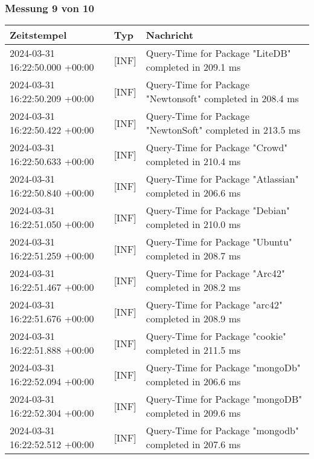     \subsubsection{Messung 9 von 10} \label{subsubsec:MySQLOhneIndex9von10}
        {
            {\small
                \begin{tabularx}{\textwidth}{|l|l|X|}
                    \hline
                    \textbf{Zeitstempel} & \textbf{Typ} & \textbf{Nachricht} \\
                    \hline
                    \endhead
                    2024-03-31 16:22:50.000 +00:00 & [INF] & Query-Time for Package "LiteDB" completed in 209.1 ms \\
                    2024-03-31 16:22:50.209 +00:00 & [INF] & Query-Time for Package "Newtonsoft" completed in 208.4 ms \\
                    2024-03-31 16:22:50.422 +00:00 & [INF] & Query-Time for Package "NewtonSoft" completed in 213.5 ms \\
                    2024-03-31 16:22:50.633 +00:00 & [INF] & Query-Time for Package "Crowd" completed in 210.4 ms \\
                    2024-03-31 16:22:50.840 +00:00 & [INF] & Query-Time for Package "Atlassian" completed in 206.6 ms \\
                    2024-03-31 16:22:51.050 +00:00 & [INF] & Query-Time for Package "Debian" completed in 210.0 ms \\
                    2024-03-31 16:22:51.259 +00:00 & [INF] & Query-Time for Package "Ubuntu" completed in 208.7 ms \\
                    2024-03-31 16:22:51.467 +00:00 & [INF] & Query-Time for Package "Arc42" completed in 208.2 ms \\
                    2024-03-31 16:22:51.676 +00:00 & [INF] & Query-Time for Package "arc42" completed in 208.9 ms \\
                    2024-03-31 16:22:51.888 +00:00 & [INF] & Query-Time for Package "cookie" completed in 211.5 ms \\
                    2024-03-31 16:22:52.094 +00:00 & [INF] & Query-Time for Package "mongoDb" completed in 206.6 ms \\
                    2024-03-31 16:22:52.304 +00:00 & [INF] & Query-Time for Package "mongoDB" completed in 209.6 ms \\
                    2024-03-31 16:22:52.512 +00:00 & [INF] & Query-Time for Package "mongodb" completed in 207.6 ms \\

\end{tabularx}}}
